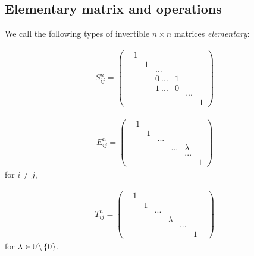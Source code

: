 \documentclass[a4paper]{article}
\begin{document}
\subsection{Elementary matrix and operations}

\begin{defi}
We call the following types of invertible $n\times n$ matrices \emph{elementary}:

\begin{equation*}
\begin{aligned}
S_{ij}^n = \left(\begin{matrix}
&1 & & & & &\\
& &1 & & & &\\
& & &... & & &\\
& & & 0\  ... & 1 & &\\
& & & 1\  ... & 0 & &\\
& & & & & ... &\\
& & & & & & 1
\end{matrix}\right)
\end{aligned}
\end{equation*}

\begin{equation*}
\begin{aligned}
E_{ij}^n = \left(\begin{matrix}
&1 & & & & &\\
& &1 & & & &\\
& & &... & & &\\
& & & & ...& \lambda &\\
& & & & & ... &\\
& & & & & & 1
\end{matrix}\right)
\end{aligned}
\end{equation*}
for $i \neq j$,

\begin{equation*}
\begin{aligned}
T_{ij}^n = \left(\begin{matrix}
&1 & & & & &\\
& &1 & & & &\\
& & &...& & & &\\
& & & &\lambda & &\\
& & & & & ... &\\
& & & & & & 1
\end{matrix}\right)
\end{aligned}
\end{equation*}
for $\lambda \in \mathbb{F} \backslash \left\{0\right\}$.
\end{defi}
\end{document}
